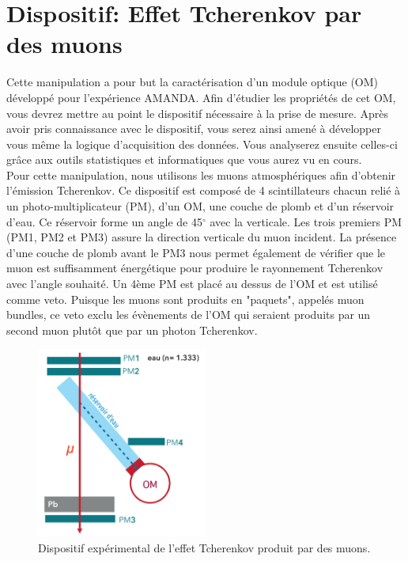 \section{Dispositif: Effet Tcherenkov par des muons}

Cette manipulation a pour but la caractérisation d'un module optique (OM) développé pour l'expérience AMANDA. Afin d'étudier les propriétés de cet OM, vous devrez mettre au point le dispositif nécessaire à la prise de mesure. Après avoir pris connaissance avec le dispositif, vous serez ainsi amené à développer vous même la logique d'acquisition des données. Vous analyserez ensuite celles-ci grâce aux outils statistiques et informatiques que vous aurez vu en cours. \\

Pour cette manipulation, nous utilisons les muons atmosphériques afin d'obtenir l'émission Tcherenkov. Ce dispositif est composé de 4 scintillateurs chacun relié à un photo-multiplicateur (PM), d'un OM, une couche de plomb et d'un réservoir d'eau. Ce réservoir forme un angle de 45$^{\circ}$ avec la verticale. Les trois premiers PM (PM1, PM2 et PM3) assure la direction verticale du muon incident. La présence d'une couche de plomb avant le PM3 nous permet également de vérifier que le muon est suffisamment énergétique pour produire le rayonnement Tcherenkov avec l'angle souhaité. Un 4ème PM est placé au dessus de l'OM et est utilisé comme veto. Puisque les muons sont produits en "paquets", appelés muon bundles, ce veto exclu les évènements de l'OM qui seraient produits par un second muon plutôt que par un photon Tcherenkov.

\begin{figure}[!h]
    \centering
	\includegraphics[width=0.5\textwidth]{figures/Dispositif_2.png}
    \caption{Dispositif expérimental de l'effet Tcherenkov produit par des muons.}
    \label{fig:dispo2} 
\end{figure}

